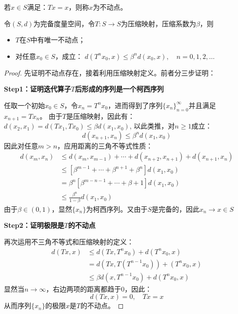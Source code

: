 \begin{definition}
    若$x \in S$满足：$Tx=x$，则称$x$为不动点。
\end{definition}

\begin{theorem}   \label{th-cmt}
    令$\left(S,d\right)$为完备度量空间，令$T:S\rightarrow S$为压缩映射，压缩系数为$\beta$，则
    \begin{itemize}
        \item $T$在$S$中有唯一不动点；
        \item 对任意$x_0 \in S$，成立：
            $d\left(T^nx_0, x\right) \leq \beta^n d\left(x_0,x\right), \quad n=0,1,2,\dots$
    \end{itemize}
\end{theorem}

\begin{proof}
    先证明不动点存在，接着利用压缩映射定义。前者分三步证明：

    \textbf{Step1：证明迭代算子$T$后形成的序列是一个柯西序列}

    任取一个初始$x_0 \in S$，令$x_n=T^n x_0$，进而得到了序列$\{x_n\}_{n=0}^{\infty}$并且满足$x_{n+1}=Tx_n$。
    由于$T$是压缩映射，因此有：$d\left(x_2, x_1\right)=d\left(T x_1, T x_0\right) \leq \beta d\left(x_1, x_0\right)$,
    以此类推，对$n\geq 1$成立：
    $$
    d\left(x_{n+1}, x_n\right) \leq \beta^n d\left(x_1, x_0\right)
    $$
    因此对任意$m>n$，应用距离的三角不等式性质：
    $$
    \begin{aligned}
    d\left(x_m, x_n\right) & \leq d\left(x_m, x_{m-1}\right)+\cdots+d\left(x_{n+2}, x_{n+1}\right)+d\left(x_{n+1}, x_n\right) \\
    & \leq\left[\beta^{m-1}+\cdots+\beta^{n+1}+\beta^n\right] d\left(x_1, x_0\right) \\
    & =\beta^n\left[\beta^{m-n-1}+\cdots+\beta+1\right] d\left(x_1, x_0\right) \\
    & \leq \frac{\beta^n}{1-\beta} d\left(x_1, x_0\right)
    \end{aligned}
    $$
    由于$\beta \in \left(0,1\right)$，显然$\{x_n\}$为柯西序列。又由于$S$是完备的，因此$x_n\rightarrow x \in S$

    \textbf{Step2：证明极限是$T$的不动点}

    再次运用不三角不等式和压缩映射的定义：
    $$
    \begin{aligned}
        d(T x, x) & \leq d\left(T x, T^n x_0\right)+d\left(T^n x_0, x\right) \\
        &= d\left(Tx,T\left(T^{n-1}x_0\right)\right) + \left(T^n x_0, x\right) \\
        & \leq \beta d\left(x, T^{n-1} x_0\right)+d\left(T^n x_0, x\right)
    \end{aligned}
    $$
    显然当$n\rightarrow \infty$，右边两项的距离都趋于0，因此：
    $$d\left(Tx,x\right)=0, \quad Tx = x$$
    从而序列$\{x_n\}$的极限$x$是$T$的不动点。


\end{proof}
